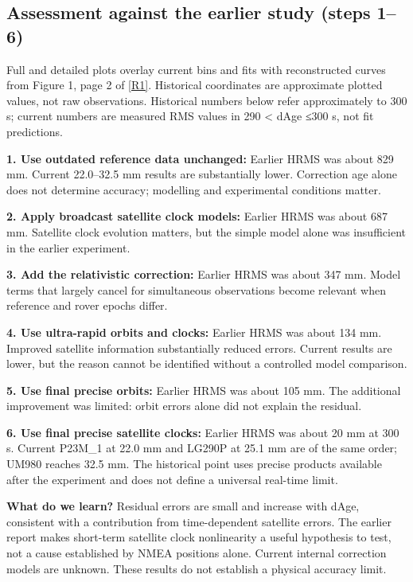 \documentclass[11pt,a4paper]{article}
\numberwithin{equation}{section}
\numberwithin{figure}{section}
\begin{document}
\subsection{Assessment against the earlier study (steps 1–6)}

Full and detailed plots overlay current bins and fits with reconstructed curves from Figure 1, page 2 of \hyperlink{ref-R1}{[R1]}. Historical coordinates are approximate plotted values, not raw observations. Historical numbers below refer approximately to 300 s; current numbers are measured RMS values in 290 < dAge ≤300 s, not fit predictions.

\textbf{1. Use outdated reference data unchanged:} Earlier HRMS was about 829 mm. Current 22.0–32.5 mm results are substantially lower. Correction age alone does not determine accuracy; modelling and experimental conditions matter.

\textbf{2. Apply broadcast satellite clock models:} Earlier HRMS was about 687 mm. Satellite clock evolution matters, but the simple model alone was insufficient in the earlier experiment.

\textbf{3. Add the relativistic correction:} Earlier HRMS was about 347 mm. Model terms that largely cancel for simultaneous observations become relevant when reference and rover epochs differ.

\textbf{4. Use ultra-rapid orbits and clocks:} Earlier HRMS was about 134 mm. Improved satellite information substantially reduced errors. Current results are lower, but the reason cannot be identified without a controlled model comparison.

\textbf{5. Use final precise orbits:} Earlier HRMS was about 105 mm. The additional improvement was limited: orbit errors alone did not explain the residual.

\textbf{6. Use final precise satellite clocks:} Earlier HRMS was about 20 mm at 300 s. Current P23M\_1 at 22.0 mm and LG290P at 25.1 mm are of the same order; UM980 reaches 32.5 mm. The historical point uses precise products available after the experiment and does not define a universal real-time limit.

\textbf{What do we learn?} Residual errors are small and increase with dAge, consistent with a contribution from time-dependent satellite errors. The earlier report makes short-term satellite clock nonlinearity a useful hypothesis to test, not a cause established by NMEA positions alone. Current internal correction models are unknown. These results do not establish a physical accuracy limit.
\end{document}
